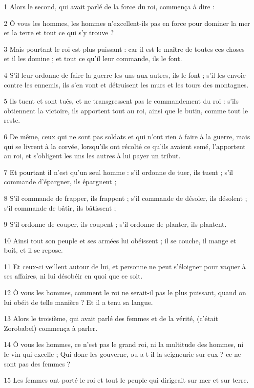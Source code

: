 \par 1 Alors le second, qui avait parlé de la force du roi, commença à dire :
\par 2 Ô vous les hommes, les hommes n'excellent-ils pas en force pour dominer la mer et la terre et tout ce qui s'y trouve ?
\par 3 Mais pourtant le roi est plus puissant : car il est le maître de toutes ces choses et il les domine ; et tout ce qu'il leur commande, ils le font.
\par 4 S'il leur ordonne de faire la guerre les uns aux autres, ils le font ; s'il les envoie contre les ennemis, ils s'en vont et détruisent les murs et les tours des montagnes.
\par 5 Ils tuent et sont tués, et ne transgressent pas le commandement du roi : s'ils obtiennent la victoire, ils apportent tout au roi, ainsi que le butin, comme tout le reste.
\par 6 De même, ceux qui ne sont pas soldats et qui n'ont rien à faire à la guerre, mais qui se livrent à la corvée, lorsqu'ils ont récolté ce qu'ils avaient semé, l'apportent au roi, et s'obligent les uns les autres à lui payer un tribut.
\par 7 Et pourtant il n'est qu'un seul homme : s'il ordonne de tuer, ils tuent ; s'il commande d'épargner, ils épargnent ;
\par 8 S'il commande de frapper, ils frappent ; s'il commande de désoler, ils désolent ; s’il commande de bâtir, ils bâtissent ;
\par 9 S'il ordonne de couper, ils coupent ; s'il ordonne de planter, ils plantent.
\par 10 Ainsi tout son peuple et ses armées lui obéissent ; il se couche, il mange et boit, et il se repose.
\par 11 Et ceux-ci veillent autour de lui, et personne ne peut s'éloigner pour vaquer à ses affaires, ni lui désobéir en quoi que ce soit.
\par 12 Ô vous les hommes, comment le roi ne serait-il pas le plus puissant, quand on lui obéit de telle manière ? Et il a tenu sa langue.
\par 13 Alors le troisième, qui avait parlé des femmes et de la vérité, (c'était Zorobabel) commença à parler.
\par 14 Ô vous les hommes, ce n'est pas le grand roi, ni la multitude des hommes, ni le vin qui excelle ; Qui donc les gouverne, ou a-t-il la seigneurie sur eux ? ce ne sont pas des femmes ?
\par 15 Les femmes ont porté le roi et tout le peuple qui dirigeait sur mer et sur terre.
